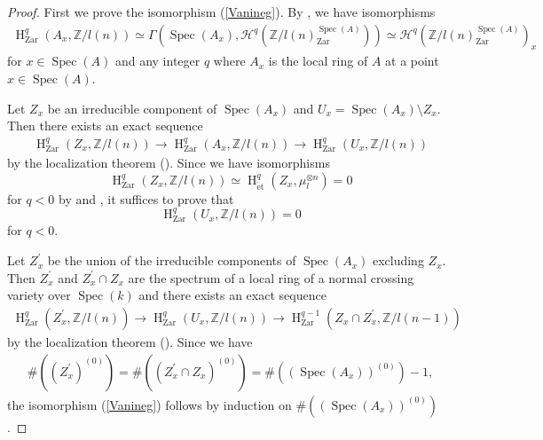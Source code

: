 \documentclass{article}
\newcommand{\spec}{\operatorname{Spec}}
\newcommand{\et}{\mathrm{\acute{e}t}}
\newcommand{\Zar}{\mathrm{Zar}}
\newcommand{\HO}{\operatorname{H}}
\begin{document}
%
\begin{proof}\upshape
First we prove the isomorphism (\ref{Vanineg}).
By \cite[p.779, Theorem 3.2.b)]{Ge}, we have isomorphisms
%
\begin{align*}
\HO^{q}_{\Zar}(
A_{x},
\mathbb{Z}/l(n)
) 
\simeq 
\Gamma(
\spec(A_{x}),
\mathcal{H}^{q}(
\mathbb{Z}/l(n)_{\Zar}^{\spec(A)}
)
)
\simeq
\mathcal{H}^{q}(
\mathbb{Z}/l(n)^{\spec(A)}_{\Zar}
)_{x}
\end{align*}
%
for $x\in \spec(A)$ and any integer $q$ where $A_{x}$
is the local ring of $A$ at a point
$x\in\spec(A)$.

Let $Z_{x}$ be an irreducible component of $\spec(A_{x})$ and 
$U_{x}=\spec(A_{x})\setminus Z_{x}$. Then there exists an exact
sequence
%
\begin{align*}
\HO^{q}_{\Zar}(
Z_{x},
\mathbb{Z}/l(n)
)    
\to
\HO^{q}_{\Zar}(
A_{x},
\mathbb{Z}/l(n)
)
\to
\HO^{q}_{\Zar}(
U_{x},
\mathbb{Z}/l(n)
)
\end{align*}
%
by the localization theorem (\cite[p.779, Theorem 3.2]{Ge}). Since we have isomorphisms
%
\begin{equation*}
\HO^{q}_{\Zar}(
Z_{x},
\mathbb{Z}/l(n)
)
\simeq
\HO^{q}_{\et}(
Z_{x},
\mu_{l}^{\otimes n}
)
=0
\end{equation*}
%
for $q<0$ by \cite[p.774, Theorem 1.2]{Ge} and \cite{V2},
it suffices to prove that
%
\begin{equation*}
\HO^{q}_{\Zar}(
U_{x}, 
\mathbb{Z}/l(n)
)    
=0
\end{equation*}
%
for $q<0$.

Let $Z^{\prime}_{x}$ be the union of the irreducible components of $\spec(A_{x})$
excluding $Z_{x}$. Then $Z^{\prime}_{x}$ and 
$Z^{\prime}_{x}\cap Z_{x}$ are the spectrum of a local ring of a normal crossing
variety over $\spec(k)$ and there exists an exact sequence
%
\begin{align*}
\HO^{q}_{\Zar}(
Z_{x}^{\prime},
\mathbb{Z}/l(n)
)    
\to
\HO^{q}_{\Zar}(
U_{x},
\mathbb{Z}/l(n)
)
\to
\HO^{q-1}_{\Zar}(
Z_{x}\cap Z_{x}^{\prime},
\mathbb{Z}/l(n-1)
)
\end{align*}
%
by the localization theorem (\cite[p.779, Theorem 3.2]{Ge}).
Since we have
%
\begin{align*}
\#\left(
(Z^{\prime}_{x})^{(0)}
\right)    
=
\#\left(
(Z^{\prime}_{x}\cap Z_{x})^{(0)}
\right)
=
\#\left(
(\spec(A_{x}))^{(0)}
\right)-1,
\end{align*}
%
the isomorphism (\ref{Vanineg}) follows by induction on
$\#\left((\spec(A_{x}))^{(0)}\right)$.


\end{proof}
\end{document}
